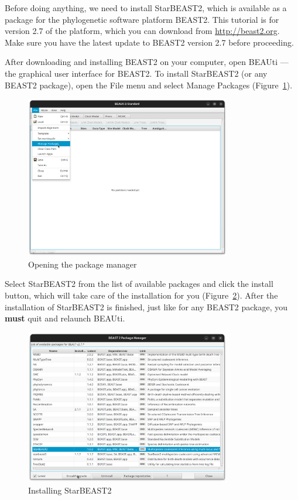 \documentclass[12pt]{article}
\begin{document}
Before doing anything, we need to install StarBEAST2, which is available as a package for
the phylogenetic software platform BEAST2. This tutorial is for version 2.7 of the platform, which you can download from \url{http://beast2.org}.
Make sure you have the latest update to BEAST2 version 2.7 before proceeding.

After downloading and installing BEAST2 on your computer, open BEAUti ---
the graphical user interface for BEAST2. To install StarBEAST2 (or
any BEAST2 package), open the File menu and select Manage Packages (Figure~\ref{fig:managePackages}).

\begin{figure}[htb!]
\centering
\includegraphics[width=0.8\textwidth]{figures/managePackages.png}
\caption
{Opening the package manager}
\label{fig:managePackages}
\end{figure}

\clearpage

Select StarBEAST2 from the list of available packages and click the install button, which will take
care of the installation for you (Figure~\ref{fig:installStarBEAST2}). After the installation of StarBEAST2 is finished, just like for any BEAST2 package, you
\textbf{must} quit and relaunch BEAUti.

\begin{figure}[htb!]
\centering
\includegraphics[width=0.8\textwidth]{figures/installStarBEAST2.png}
\caption
{Installing StarBEAST2}
\label{fig:installStarBEAST2}
\end{figure}
\end{document}
